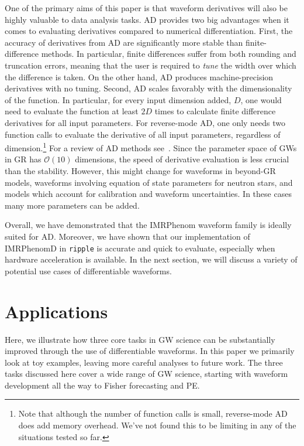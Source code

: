 \documentclass[twocolumn]{aastex631}
\newcommand{\ripple}{\texttt{ripple}\xspace}
\begin{document}
One of the primary aims of this paper is that waveform derivatives will also be highly valuable to data analysis tasks. 
AD provides two big advantages when it comes to evaluating derivatives compared to numerical differentiation.
First, the accuracy of derivatives from AD are significantly more stable than finite-difference methods.
In particular, finite differences suffer from both rounding and truncation errors, meaning that the user is required to \textit{tune} the width over which the difference is taken.
On the other hand, AD produces machine-precision derivatives with no tuning.
Second, AD scales favorably with the dimensionality of the function.
In particular, for every input dimension added, $D$, one would need to evaluate the function at least $2D$ times to calculate finite difference derivatives for all input parameters.
For reverse-mode AD, one only needs two function calls to evaluate the derivative of all input parameters, regardless of dimension.\footnote{
    Note that although the number of function calls is small, reverse-mode AD does add memory overhead.
    We've not found this to be limiting in any of the situations tested so far.
}
For a review of AD methods see~\cite{2018arXiv181105031M}.
Since the parameter space of GWs in GR has $\mathcal{O}(10)$ dimensions, the speed of derivative evaluation is less crucial than the stability.
However, this might change for waveforms in beyond-GR models, waveforms involving equation of state parameters for neutron stars, and models which account for calibration and waveform uncertainties.
In these cases many more parameters can be added.

Overall, we have demonstrated that the IMRPhenom waveform family is ideally suited for AD.
Moreover, we have shown that our implementation of IMRPhenomD in \ripple is accurate and quick to evaluate, especially when hardware acceleration is available.
In the next section, we will discuss a variety of potential use cases of differentiable waveforms.

\section{Applications}
\label{sec:applications}

Here, we illustrate how three core tasks in GW science can be substantially improved through the use of differentiable waveforms.
In this paper we primarily look at toy examples, leaving more careful analyses to future work. 
The three tasks discussed here cover a wide range of GW science, starting with waveform development all the way to Fisher forecasting and PE.
\end{document}
